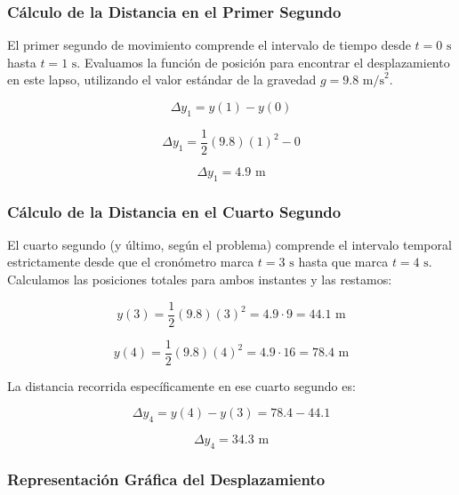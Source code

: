 \documentclass[12pt, a4paper]{article}
\begin{document}
\subsubsection*{Cálculo de la Distancia en el Primer Segundo}

El primer segundo de movimiento comprende el intervalo de tiempo desde $t=0 \text{ s}$ hasta $t=1 \text{ s}$. Evaluamos la función de posición para encontrar el desplazamiento en este lapso, utilizando el valor estándar de la gravedad $g = 9.8 \text{ m/s}^2$.

\begin{equation}
\Delta y_1 = y(1) - y(0)
\end{equation}

\begin{equation}
\Delta y_1 = \frac{1}{2}(9.8)(1)^2 - 0
\end{equation}

\begin{equation}
\Delta y_1 = 4.9 \text{ m}
\end{equation}

\subsubsection*{Cálculo de la Distancia en el Cuarto Segundo}

El cuarto segundo (y último, según el problema) comprende el intervalo temporal estrictamente desde que el cronómetro marca $t=3 \text{ s}$ hasta que marca $t=4 \text{ s}$. Calculamos las posiciones totales para ambos instantes y las restamos:

\begin{equation}
y(3) = \frac{1}{2}(9.8)(3)^2 = 4.9 \cdot 9 = 44.1 \text{ m}
\end{equation}

\begin{equation}
y(4) = \frac{1}{2}(9.8)(4)^2 = 4.9 \cdot 16 = 78.4 \text{ m}
\end{equation}

La distancia recorrida específicamente en ese cuarto segundo es:

\begin{equation}
\Delta y_4 = y(4) - y(3) = 78.4 - 44.1
\end{equation}

\begin{equation}
\Delta y_4 = 34.3 \text{ m}
\end{equation}

\subsubsection*{Representación Gráfica del Desplazamiento}
\end{document}
